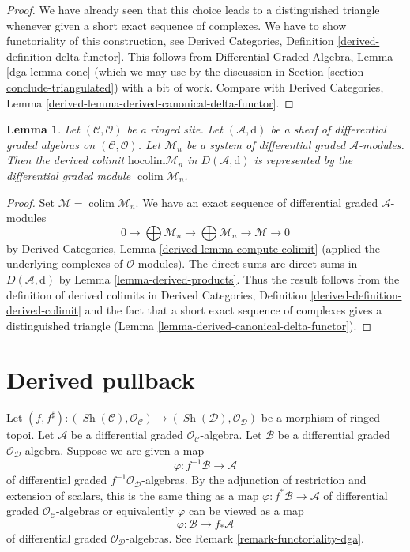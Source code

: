 \documentclass{stacks-project}
\theoremstyle{plain}
\newtheorem{lemma}[subsection]{Lemma}
\theoremstyle{definition}
\theoremstyle{remark}
\numberwithin{equation}{subsection}
\def\colim{\mathop{\mathrm{colim}}\nolimits}
\def\Sh{\mathop{\mathit{Sh}}\nolimits}
\begin{document}
\begin{proof}
We have already seen that this choice leads to a distinguished
triangle whenever given a short exact sequence of complexes.
We have to show functoriality of this construction, see
Derived Categories, Definition \ref{derived-definition-delta-functor}.
This follows from Differential Graded Algebra, Lemma \ref{dga-lemma-cone}
(which we may use by the discussion in
Section \ref{section-conclude-triangulated}) with a bit of
work. Compare with
Derived Categories, Lemma \ref{derived-lemma-derived-canonical-delta-functor}.
\end{proof}

\begin{lemma}
\label{lemma-homotopy-colimit}
Let $(\mathcal{C}, \mathcal{O})$ be a ringed site. Let
$(\mathcal{A}, \text{d})$ be a sheaf of differential graded algebras
on $(\mathcal{C}, \mathcal{O})$. Let
$\mathcal{M}_n$ be a system of differential graded $\mathcal{A}$-modules.
Then the derived colimit $\text{hocolim} \mathcal{M}_n$ in
$D(\mathcal{A}, \text{d})$ is represented
by the differential graded module $\colim \mathcal{M}_n$.
\end{lemma}

\begin{proof}
Set $\mathcal{M} = \colim \mathcal{M}_n$.
We have an exact sequence of differential graded $\mathcal{A}$-modules
$$
0 \to \bigoplus \mathcal{M}_n \to \bigoplus \mathcal{M}_n \to \mathcal{M} \to 0
$$
by Derived Categories, Lemma \ref{derived-lemma-compute-colimit}
(applied the underlying complexes of $\mathcal{O}$-modules).
The direct sums are direct sums in $D(\mathcal{A}, \text{d})$ by
Lemma \ref{lemma-derived-products}.
Thus the result follows from the definition
of derived colimits in Derived Categories,
Definition \ref{derived-definition-derived-colimit}
and the fact that a short exact sequence of complexes
gives a distinguished triangle
(Lemma \ref{lemma-derived-canonical-delta-functor}).
\end{proof}






\section{Derived pullback}
\label{section-derived-pullback}

\noindent
Let $(f, f^\sharp) : (\Sh(\mathcal{C}), \mathcal{O}_\mathcal{C})
\to (\Sh(\mathcal{D}), \mathcal{O}_\mathcal{D})$
be a morphism of ringed topoi. Let $\mathcal{A}$ be a differential
graded $\mathcal{O}_\mathcal{C}$-algebra. Let $\mathcal{B}$ be a
differential graded $\mathcal{O}_\mathcal{D}$-algebra.
Suppose we are given a map
$$
\varphi : f^{-1}\mathcal{B} \to \mathcal{A}
$$
of differential graded $f^{-1}\mathcal{O}_\mathcal{D}$-algebras.
By the adjunction of restriction and extension of scalars, this
is the same thing as a map $\varphi : f^*\mathcal{B} \to \mathcal{A}$
of differential graded $\mathcal{O}_\mathcal{C}$-algebras or equivalently
$\varphi$ can be viewed as a map
$$
\varphi : \mathcal{B} \to f_*\mathcal{A}
$$
of differential graded $\mathcal{O}_\mathcal{D}$-algebras.
See Remark \ref{remark-functoriality-dga}.
\end{document}
